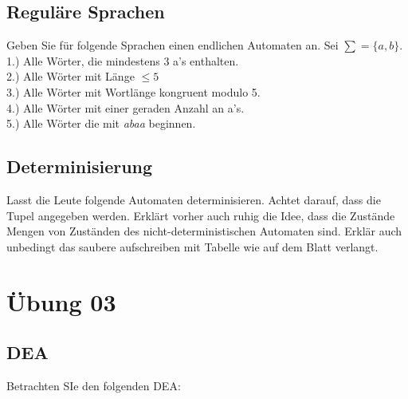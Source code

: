 \documentclass[paper=a4, fontsize=11pt]{scrartcl}
\numberwithin{equation}{section}
\numberwithin{figure}{section}
\numberwithin{table}{section}
\begin{document}

\subsection{Reguläre Sprachen}

Geben Sie für folgende Sprachen einen endlichen Automaten an. Sei $\sum = \{ a,b \}$. \\

1.) Alle Wörter, die mindestens 3 a's enthalten. \\

2.) Alle Wörter mit Länge $\leq 5$ \\

3.) Alle Wörter mit Wortlänge kongruent modulo 5. \\

4.) Alle Wörter mit einer geraden Anzahl an a's. \\

5.) Alle Wörter die mit \emph{abaa} beginnen. \\


\subsection{Determinisierung}

Lasst die Leute folgende Automaten determinisieren. Achtet darauf, dass die Tupel angegeben werden. Erklärt vorher auch ruhig die Idee, dass die Zustände Mengen von Zuständen des nicht-deterministischen Automaten sind. Erklär auch unbedingt das saubere aufschreiben mit Tabelle wie auf dem Blatt verlangt.


\newpage

\section{Übung 03}


\subsection{DEA}

Betrachten SIe den folgenden DEA: \\
\end{document}
